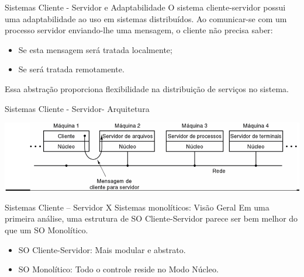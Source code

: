 \documentclass{beamer}
\begin{document}
\begin{frame}{Sistemas Cliente - Servidor e Adaptabilidade}
    O sistema cliente-servidor possui uma adaptabilidade ao uso em sistemas distribuídos. Ao comunicar-se com um processo servidor enviando-lhe uma mensagem, o cliente não precisa saber:

    \begin{itemize}
        \item Se esta mensagem será tratada localmente;
        \item Se será tratada remotamente.
    \end{itemize}

    Essa abstração proporciona flexibilidade na distribuição de serviços no sistema.
\end{frame}

\begin{frame}{Sistemas Cliente - Servidor- Arquitetura}

    \vspace{1cm}
    \begin{center}
        \includegraphics[width=0.9\linewidth]{assets/aula-tads-sope/SO-cli-ser-2.png} %
    \end{center}
\end{frame}
\begin{frame}{Sistemas Cliente – Servidor X Sistemas monolíticos: Visão Geral}
    Em uma primeira análise, uma estrutura de SO Cliente-Servidor parece ser bem melhor do que um SO Monolítico.
    \begin{itemize}
        \item SO Cliente-Servidor: Mais modular e abstrato.
        \item SO Monolítico: Todo o controle reside no Modo Núcleo.
    \end{itemize}
\end{frame}
\end{document}
